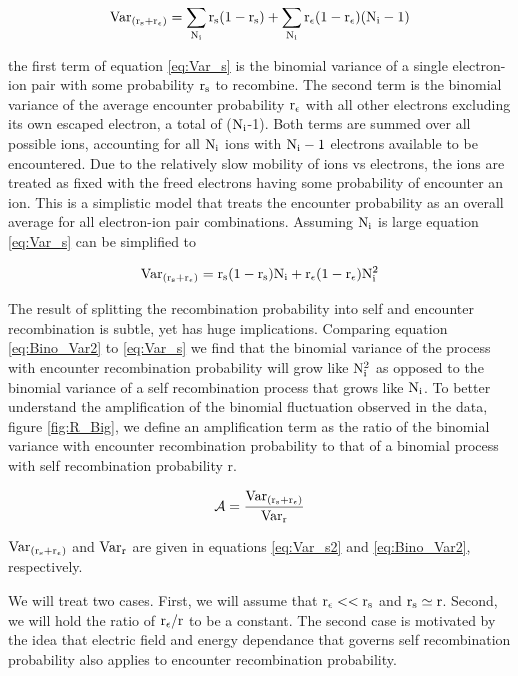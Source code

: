 \begin{equation}
\rm Var_{(r_s + r_\epsilon)} = \sum\limits_{N_i}r_s(1-r_s) + \sum\limits_{N_i} r_\epsilon(1-r_\epsilon)(N_i-1)
\label{eq:Var_s}
\end{equation}

\noindent the first term of equation \ref{eq:Var_s} is the binomial variance of a single electron-ion pair with some probability $\rm r_s$ to recombine. The second term is the binomial variance of the average encounter probability $\rm r_\epsilon$ with all other electrons excluding its own escaped electron, a total of ($\rm N_i$-1). Both terms are summed over all possible ions, accounting for all $\rm N_i$ ions with $\rm N_i -1$ electrons available to be encountered. Due to the relatively slow mobility of ions vs electrons, the ions are treated as fixed with the freed electrons having some probability of encounter an ion. This is a simplistic model that treats the encounter probability as an overall average for all electron-ion pair combinations. Assuming $\rm N_i$ is large equation \ref{eq:Var_s} can be simplified to 

\begin{equation}
\rm Var_{(r_s + r_\epsilon)} = r_s(1-r_s)N_i + r_\epsilon(1-r_\epsilon)N_i^2
\label{eq:Var_s2}
\end{equation}

The result of splitting the recombination probability into self and encounter recombination is subtle, yet has huge implications. Comparing equation \ref{eq:Bino_Var2} to \ref{eq:Var_s} we find that the binomial variance of the process with encounter recombination probability will grow like $\rm N_i^2$ as opposed to the binomial variance of a self recombination process that grows like $\rm N_i$. To better understand the amplification of the binomial fluctuation observed in the data, figure \ref{fig:R_Big}, we define an amplification term as the ratio of the binomial variance with encounter recombination probability to that of a binomial process with self recombination probability r.

\begin{equation}
\rm \mathcal{A}= \frac{Var_{(r_s + r_\epsilon)}}{Var_r}
\label{eq:Amp}
\end{equation}

\noindent $\rm Var_{(r_s + r_\epsilon)}$ and $\rm Var_r$ are given in equations \ref{eq:Var_s2} and \ref{eq:Bino_Var2}, respectively. 


We will treat two cases. First, we will assume that $\rm r_\epsilon << r_s$ and $\rm r_s \simeq r$. Second, we will hold the ratio of $\rm r_\epsilon/r$ to be a constant. The second case is motivated by the idea that electric field and energy dependance that governs self recombination probability also applies to encounter recombination probability.

